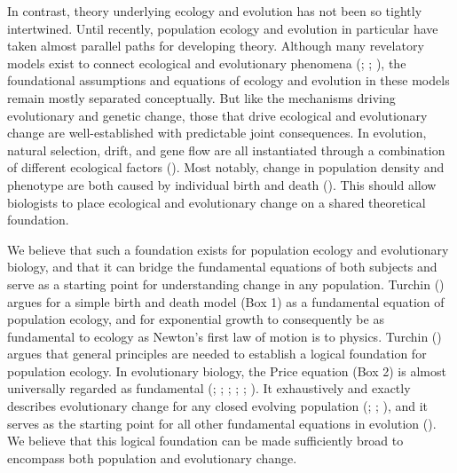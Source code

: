 \documentclass[
]{article}
\begin{document}
In contrast, theory underlying ecology and evolution has not been so
tightly intertwined. Until recently, population ecology and evolution in
particular have taken almost parallel paths for developing theory.
Although many revelatory models exist to connect ecological and
evolutionary phenomena (;
;
), the foundational
assumptions and equations of ecology and evolution in these models
remain mostly separated conceptually. But like the mechanisms driving
evolutionary and genetic change, those that drive ecological and
evolutionary change are well-established with predictable joint
consequences. In evolution, natural selection, drift, and gene flow are
all instantiated through a combination of different ecological factors
(). Most notably, change
in population density and phenotype are both caused by individual birth
and death (). This should allow
biologists to place ecological and evolutionary change on a shared
theoretical foundation.

We believe that such a foundation exists for population ecology and
evolutionary biology, and that it can bridge the fundamental equations
of both subjects and serve as a starting point for understanding change
in any population. Turchin () argues for
a simple birth and death model (Box 1) as a fundamental equation of
population ecology, and for exponential growth to consequently be as
fundamental to ecology as Newton's first law of motion is to physics.
Turchin () argues that general
principles are needed to establish a logical foundation for population
ecology. In evolutionary biology, the Price equation (Box 2) is almost
universally regarded as fundamental (; ;
;
; ; ). It
exhaustively and exactly describes evolutionary change for any closed
evolving population (;
;
), and it serves as the
starting point for all other fundamental equations in evolution
(). We believe that this logical
foundation can be made sufficiently broad to encompass both population
and evolutionary change.
\end{document}
